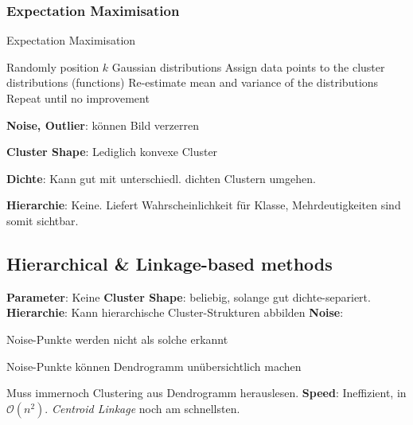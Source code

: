 \documentclass[10pt]{article} %
\begin{document}
\myhline

\subsubsection{Expectation Maximisation}

\begingroup
\removelatexerror
\begin{algorithm}[H]
   \caption{Expectation Maximisation}
   Randomly position $k$ Gaussian distributions \;
   Assign data points to the cluster distributions (functions) \;
   Re-estimate mean and variance of the distributions \;
   Repeat until no improvement \;
\end{algorithm}
\endgroup

\begin{cptitemize} 
 	 \item \textbf{Noise, Outlier}: können Bild verzerren
 	 \item \textbf{Cluster Shape}: Lediglich konvexe Cluster
 	 \item \textbf{Dichte}: Kann gut mit unterschiedl. dichten Clustern
 	 umgehen.
 	 \item \textbf{Hierarchie}: Keine.
 	 \advantageit Liefert Wahrscheinlichkeit für Klasse,
 	 Mehrdeutigkeiten sind somit sichtbar.
\end{cptitemize} 


\subsection{Hierarchical \& Linkage-based methods}


\begin{cptitemize} 
   \advantageit \textbf{Parameter}: Keine
   \advantageit \textbf{Cluster Shape}: beliebig, solange gut
   dichte-separiert.
   \advantageit \textbf{Hierarchie}: Kann hierarchische
   Cluster-Strukturen abbilden
   \disadvantageit \textbf{Noise}:
   \begin{cptitemize} 
    	 \item  Noise-Punkte werden nicht als solche erkannt
    	 \item Noise-Punkte können Dendrogramm unübersichtlich machen
   \end{cptitemize} 
   \disadvantageit Muss immernoch Clustering aus Dendrogramm herauslesen.
   \disadvantageit \textbf{Speed}: Ineffizient, in $\mathcal{O}(n^2)$. 
   \textit{Centroid Linkage} noch am schnellsten.
\end{cptitemize}
\end{document}
